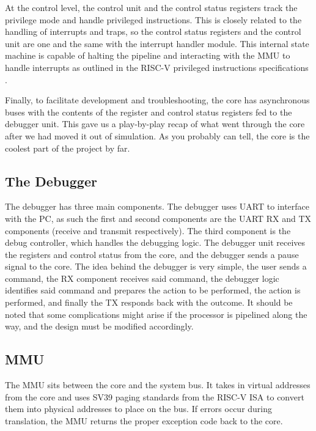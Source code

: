 \documentclass{article}
\begin{document}
    At the control level, the control unit and the control status registers track the privilege mode and handle privileged instructions.  This is closely related to the handling of interrupts and traps, so the control status registers and the control unit are one and the same with the interrupt handler module.  This internal state machine is capable of halting the pipeline and interacting with the MMU to handle interrupts as outlined in the RISC-V privileged instructions specifications \cite{RISCV_PRIV}.
    
    Finally, to facilitate development and troubleshooting, the core has asynchronous buses with the contents of the register and control status registers fed to the debugger unit.  This gave us a play-by-play recap of what went through the core after we had moved it out of simulation.  As you probably can tell, the core is the coolest part of the project by far.
    
    \subsection{The Debugger}
    The debugger has three main components.  The debugger uses UART to interface with the PC, as such the first and second components are the UART RX and TX components (receive and transmit respectively). The third component is the debug controller, which handles the debugging logic. The debugger unit receives  the registers and control status from the core, and the debugger sends a pause signal to the core. The idea behind the debugger is very simple, the user sends a command, the RX component receives said command, the debugger logic identifies said command and prepares the action to be performed, the action is performed, and finally the TX responds back with the outcome.
    It should be noted that some complications might arise if the processor is pipelined along the way, and the design must be modified accordingly.
    
    \subsection{MMU}
    The MMU sits between the core and the system bus. It takes in virtual addresses from the core and uses SV39 paging standards from the RISC-V ISA to convert them into physical addresses to place on the bus. If errors occur during translation, the MMU returns the proper exception code back to the core.
    
\end{document}
